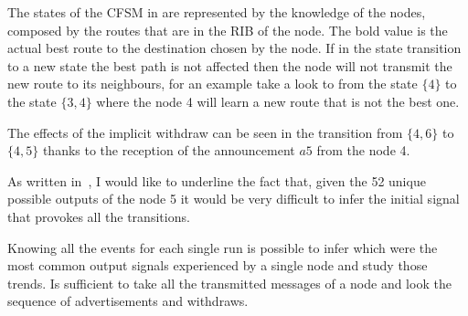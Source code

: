 The states of the \ac{CFSM} in  are represented by the
knowledge of the nodes, composed by the routes that are in the \ac{RIB} of the node.
The bold value is the actual best route to the destination chosen by the node.
If in the state transition to a new state the best path is not affected then the
node will not transmit the new route to its neighbours, for an example take
a look to  from the state $\{4\}$ to the state $\{3, 4\}$
where the node \num{4} will learn a new route that is not the best one.

The effects of the implicit withdraw can be seen in 
the transition from $\{4, 6\}$ to $\{4, 5\}$ thanks to the reception of the
announcement $a5$ from the node \num{4}.

As written in~\cite{griffinFSM}, I would like to underline the fact that, given
the \num{52} unique possible outputs of the node \num{5} it would be very difficult
to infer the initial signal that provokes all the transitions.

Knowing all the events for each single run is possible to infer which were the
most common output signals experienced by a single node  and study those trends.
Is sufficient to take all the transmitted messages of a node and look the sequence
of advertisements and withdraws.

